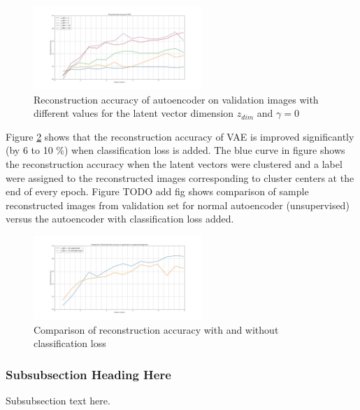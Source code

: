 \documentclass[journal]{IEEEtran}
\begin{document}
\begin{figure}[!t]
\centering
\includegraphics[width=2.5in]{reconstruction_accuracy.jpg}
\caption{Reconstruction accuracy of autoencoder on validation images with different values for the latent vector dimension  $z_{dim}$ and $\gamma = 0$}
\label{reconstruction_accuracy}
\end{figure}

Figure \ref{reconstruction_accuracy_sup_vs_unsup} shows that the reconstruction accuracy of VAE is improved significantly  (by 6 to 10 \%) when classification loss is added. The blue curve in figure shows the reconstruction accuracy when the latent vectors were clustered and a label were assigned to the reconstructed images corresponding to  cluster centers at the end of every epoch. Figure TODO add fig shows comparison of sample reconstructed images from validation set for normal autoencoder (unsupervised) versus the autoencoder with classification loss added.

\begin{figure}[!t]
\centering
\includegraphics[width=2.5in]{reconstruction_accuracy_compare_supervised_vs_unsuprevised.jpg}
\caption{Comparison of reconstruction accuracy with and without classification loss }
\label{reconstruction_accuracy_sup_vs_unsup}
\end{figure}




\subsubsection{Subsubsection Heading Here}
Subsubsection text here.
\end{document}
